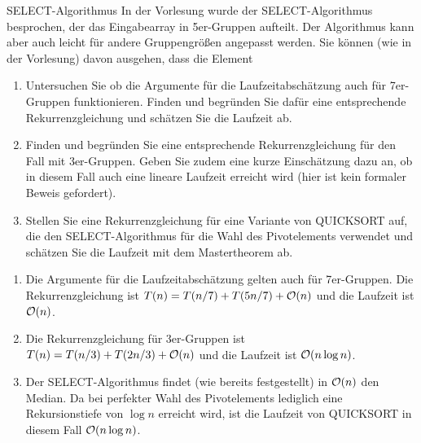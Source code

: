 \documentclass{article}
\begin{document}
\begin{exercise}{SELECT-Algorithmus}
  In der Vorlesung wurde der SELECT-Algorithmus besprochen, der das Eingabearray in 5er-Gruppen aufteilt. Der Algorithmus kann aber auch leicht für andere Gruppengrößen angepasst werden. Sie können (wie in der Vorlesung) davon ausgehen, dass die Element
  \begin{enumerate}
    \item Untersuchen Sie ob die Argumente für die Laufzeitabschätzung auch für 7er-Gruppen funktionieren. Finden und begründen Sie dafür eine entsprechende Rekurrenzgleichung und schätzen Sie die Laufzeit ab.
    \item Finden und begründen Sie eine entsprechende Rekurrenzgleichung für den Fall mit 3er-Gruppen. Geben Sie zudem eine kurze Einschätzung dazu an, ob in diesem Fall auch eine lineare Laufzeit erreicht wird (hier ist kein formaler Beweis gefordert).
    \item Stellen Sie eine Rekurrenzgleichung für eine Variante von QUICKSORT auf, die den SELECT-Algorithmus für die Wahl des Pivotelements verwendet und schätzen Sie die Laufzeit mit dem Mastertheorem ab.
  \end{enumerate}

  \begin{solution}
    \begin{enumerate}
      \item Die Argumente für die Laufzeitabschätzung gelten auch für 7er-Gruppen. Die Rekurrenzgleichung ist $T(n) = T(n/7) + T(5n/7) + \mathcal{O}(n)$ und die Laufzeit ist $\mathcal{O}(n)$.
      \item Die Rekurrenzgleichung für 3er-Gruppen ist $T(n) = T(n/3) + T(2n/3) + \mathcal{O}(n)$ und die Laufzeit ist $\mathcal{O}(n \log n)$.
      \item Der SELECT-Algorithmus findet (wie bereits festgestellt) in $\mathcal{O}(n)$ den Median. Da bei perfekter Wahl des Pivotelements lediglich eine Rekursionstiefe von $\log n$ erreicht wird, ist die Laufzeit von QUICKSORT in diesem Fall $\mathcal{O}(n \log n)$.
    \end{enumerate}
  \end{solution}
\end{exercise}
\end{document}
